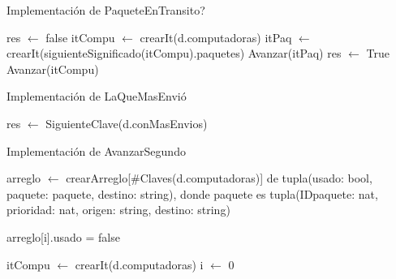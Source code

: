 \begin{Algoritmos}
\begin{algorithm}
\caption{Implementaci\'on de PaqueteEnTransito?}
\begin{algorithmic}[0]
	\State res $\gets$ false 
	\State itCompu $\gets$ crearIt(d.computadoras) 
		\newline  {}
		\State itPaq $\gets$ crearIt(siguienteSignificado(itCompu).paquetes) 
			\State Avanzar(itPaq)  
		\EndWhile
		 
			\State res $\gets$ True 
		\EndIf
		\State Avanzar(itCompu) 
	\EndWhile
\EndFunction
\end{algorithmic}
\end{algorithm}

\begin{algorithm}
\caption{Implementaci\'on de LaQueMasEnvi\'o}
\begin{algorithmic}[0]
	\State res $\gets$ SiguienteClave(d.conMasEnvios)	
\EndFunction
\end{algorithmic}
\end{algorithm}

\begin{algorithm}
\caption{Implementaci\'on de AvanzarSegundo}
\begin{algorithmic}[0]


	\State arreglo $\gets$ crearArreglo[$\#$Claves(d.computadoras)] de tupla(usado: bool, paquete: paquete, destino: string), donde paquete es tupla(IDpaquete: nat, prioridad: nat, origen: string, destino: string)
	\State {}
	
	 
	\State arreglo[i].usado = false 
	\EndFor
	
	
	\State itCompu $\gets$ crearIt(d.computadoras) 
	\State i $\gets$ 0
	

\end{algorithmic}
\end{algorithm}
\end{Algoritmos}
